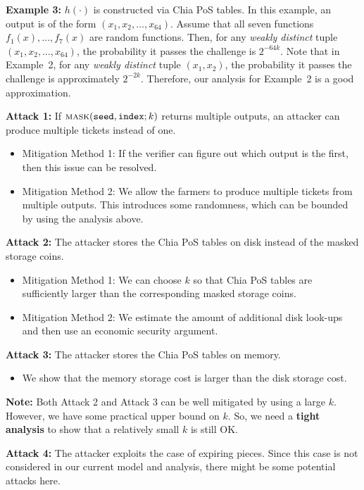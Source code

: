 \documentclass[12pt,draftcls,onecolumn]{IEEEtran}
\newcommand{\seed}{\texttt{seed}}
\newcommand{\ind}{\texttt{index}}
\newcommand{\mask}{\textsc{mask}}
\begin{document}
{\bf Example 3:} $h(\cdot)$ is constructed via Chia PoS tables. In this example, an output is of the form $(x_1, x_2, \ldots, x_{64})$. Assume that all seven functions $f_1(x), \ldots, f_7(x)$  are random functions.
Then, for any \emph{weakly distinct} tuple $(x_1, x_2, \ldots, x_{64})$, the probability it passes the challenge is $2^{-64k}$.
Note that in Example~2, for any \emph{weakly distinct} tuple $(x_1, x_2)$, the probability it passes the challenge is approximately $2^{-2k}$. Therefore, our analysis for Example~2 is a good approximation.

{\bf Attack 1:} If $\mask(\seed, \ind; k)$ returns multiple outputs, an attacker can produce multiple tickets instead of one.

\begin{itemize}
    \item Mitigation Method 1: If the verifier can figure out which output is the first, then this issue can be resolved.
    \item Mitigation Method 2: We allow the farmers to produce multiple tickets from multiple outputs. This introduces some randomness, which can be bounded by using the analysis above.
\end{itemize}

{\bf Attack 2:} The attacker stores the Chia PoS tables on disk instead of the masked storage coins.

\begin{itemize}
    \item Mitigation Method 1: We can choose $k$ so that Chia PoS tables are sufficiently larger than the corresponding masked storage coins.
    \item Mitigation Method 2: We estimate the amount of additional disk look-ups and then use an economic security argument.
\end{itemize}

{\bf Attack 3:} The attacker stores the Chia PoS tables on memory.

\begin{itemize}
    \item We show that the memory storage cost is larger than the disk storage cost.
\end{itemize}

{\bf Note:} Both Attack 2 and Attack 3 can be well mitigated by using a large $k$. However, we have some practical upper bound on $k$. So, we need a {\bf tight analysis} to show that a relatively small $k$ is still OK.

{\bf Attack 4:} The attacker exploits the case of expiring pieces. Since this case is not considered in our current model and analysis, there might be some potential attacks here.
\end{document}
